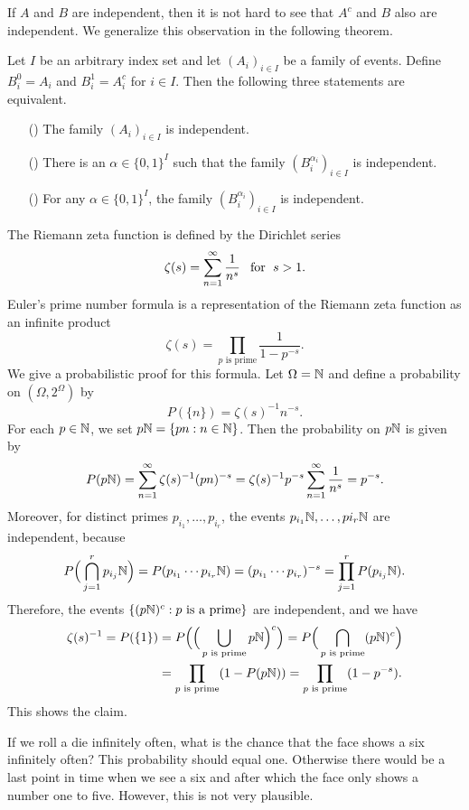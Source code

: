 If $A$ and $B$ are independent, then it is not hard to see that $A^c$ and $B$ also are independent. We generalize this observation in the following theorem.
\begin{theorem}
Let $I$ be an arbitrary index set and let $(A_i)_{i\in I}$ be a family of events. Define $B_i^0=A_i$ and $B_i^1=A_i^c$ for $i\in I$. Then the following three statements are equivalent.
\begin{itemize}
\item[(\rmnum{1})] The family $(A_i)_{i\in I}$ is independent.
\item[(\rmnum{2})] There is an $\alpha\in\{0,1\}^I$ such that the family $(B_i^{\alpha_i})_{i\in I}$ is independent.
\item[(\rmnum{3})] For any $\alpha\in\{0,1\}^I$, the family $(B_i^{\alpha_i})_{i\in I}$ is independent. 
\end{itemize}
\end{theorem}
\begin{example}
The Riemann zeta function is defined by the Dirichlet series
\[\zeta(s)=\sum_{n=1}^{\infty}\frac{1}{n^s}\hspace{8pt}\text{for}\hspace{6pt} s>1.\]
Euler's prime number formula is a representation of the Riemann zeta function as an infinite product
\[\zeta(s)=\prod_{\text{$p$ is prime}}\frac{1}{1-p^{-s}}.\]
We give a probabilistic proof for this formula. Let $\Omega=\mathbb{N}$ and define a probability on $(\Omega,2^\Omega)$ by
\[P(\{n\})=\zeta(s)^{-1}n^{-s}.\]
For each $p\in\mathbb{N}$, we set $p\mathbb{N}=\{pn:n\in\mathbb{N}\}$. Then the probability on $p\mathbb{N}$ is given by
\[P(p\mathbb{N})=\sum_{n=1}^{\infty}\zeta(s)^{-1}(pn)^{-s}=\zeta(s)^{-1}p^{-s}\sum_{n=1}^{\infty}\frac{1}{n^s}=p^{-s}.\]
Moreover, for distinct primes $p_{i_1},\dots,p_{i_r}$, the events $p_{i_1}\mathbb{N},\dots,p{i_r}\mathbb{N}$ are independent, because
\begin{align*}
P\Big(\bigcap_{j=1}^{r}p_{i_j}\mathbb{N}\Big)=P(p_{i_1}\cdots p_{i_r}\mathbb{N})=(p_{i_1}\cdots p_{i_r})^{-s}=\prod_{j=1}^{r}P(p_{i_j}\mathbb{N}).
\end{align*}
Therefore, the events $\{(p\mathbb{N})^c:\text{$p$ is a prime}\}$ are independent, and we have
\begin{align*}
\zeta(s)^{-1}=P(\{1\})&=P\Big(\Big(\bigcup_{\text{$p$ is prime}}p\mathbb{N}\Big)^c\Big)=P\Big(\bigcap_{\text{$p$ is prime}}(p\mathbb{N})^c\Big)\\
&=\prod_{\text{$p$ is prime}}(1-P(p\mathbb{N}))=\prod_{\text{$p$ is prime}}(1-p^{-s}).
\end{align*}
This shows the claim.
\end{example}
If we roll a die infinitely often, what is the chance that the face shows a six infinitely often? This probability should equal one. Otherwise there would be a last point in time when we see a six and after which the face only shows a number one to five. However, this is not very plausible.\par
